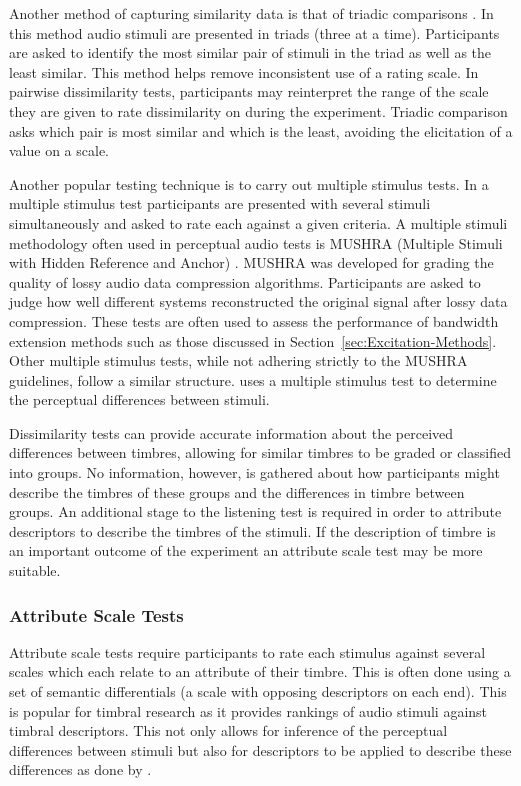 			Another method of capturing similarity data is that of triadic comparisons
			\citep{wickelmaier2007deriving}. In this method audio stimuli are presented in triads (three at a
			time). Participants are asked to identify the most similar pair of stimuli in the triad as well as
			the least similar. This method helps remove inconsistent use of a rating scale. In pairwise
			dissimilarity tests, participants may reinterpret the range of the scale they are given to rate
			dissimilarity on during the experiment. Triadic comparison asks which pair is most similar and
			which is the least, avoiding the elicitation of a value on a scale.

			Another popular testing technique is to carry out multiple stimulus tests. In a multiple stimulus
			test participants are presented with several stimuli simultaneously and asked to rate each against
			a given criteria. A multiple stimuli methodology often used in perceptual audio tests is MUSHRA
			(Multiple Stimuli with Hidden Reference and Anchor) \citep{mushra2014}. MUSHRA was developed for
			grading the quality of lossy audio data compression algorithms. Participants are asked to judge how
			well different systems reconstructed the original signal after lossy data compression.  These tests
			are often used to assess the performance of bandwidth extension methods such as those discussed in
			Section~\ref{sec:Excitation-Methods}. Other multiple stimulus tests, while not adhering strictly to
			the MUSHRA guidelines, follow a similar structure. \citet{arthi2015influence} uses a multiple
			stimulus test to determine the perceptual differences between stimuli. 
			
			Dissimilarity tests can provide accurate information about the perceived differences between
			timbres, allowing for similar timbres to be graded or classified into groups. No information,
			however, is gathered about how participants might describe the timbres of these groups and
			the differences in timbre between groups. An additional stage to the listening test is required in
			order to attribute descriptors to describe the timbres of the stimuli. If the description of timbre
			is an important outcome of the experiment an attribute scale test may be more suitable.
			
		\subsubsection*{Attribute Scale Tests}
			Attribute scale tests require participants to rate each stimulus against several scales which each
			relate to an attribute of their timbre. This is often done using a set of semantic differentials (a
			scale with opposing descriptors on each end). This is popular for timbral research as it provides
			rankings of audio stimuli against timbral descriptors. This not only allows for inference of the
			perceptual differences between stimuli but also for descriptors to be applied to describe these
			differences as done by \citet{zacharakis2014an}. 			
			

